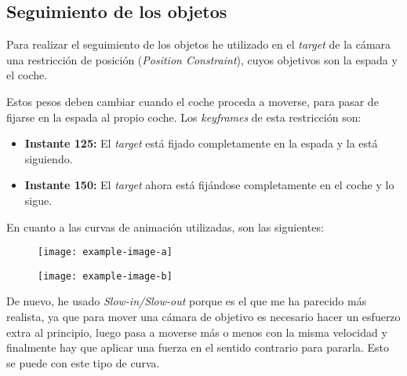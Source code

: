 \subsection{Seguimiento de los objetos}

Para realizar el seguimiento de los objetos he utilizado en el \textit{target} de la cámara una restricción de posición (\textit{Position Constraint}), cuyos objetivos son la espada y el coche.

\bigskip

Estos pesos deben cambiar cuando el coche proceda a moverse, para pasar de fijarse en la espada al propio coche. Los \textit{keyframes} de esta restricción son:

\begin{itemize}
    \item \textbf{Instante 125: }El \textit{target} está fijado completamente en la espada y la está siguiendo.
    \item \textbf{Instante 150: }El \textit{target} ahora está fijándose completamente en el coche y lo sigue.
\end{itemize}

\bigskip

En cuanto a las curvas de animación utilizadas, son las siguientes:

\begin{figure}[H]
    \centering
   \texttt{[image: example-image-a]}
\end{figure}
\begin{figure}[H]
    \centering
   \texttt{[image: example-image-b]}
\end{figure}

De nuevo, he usado \textit{Slow-in/Slow-out} porque es el que me ha parecido más realista, ya que para mover una cámara de objetivo es necesario hacer un esfuerzo extra al principio, luego pasa a moverse más o menos con la misma velocidad y finalmente hay que aplicar una fuerza en el sentido contrario para pararla. Esto se puede con este tipo de curva.